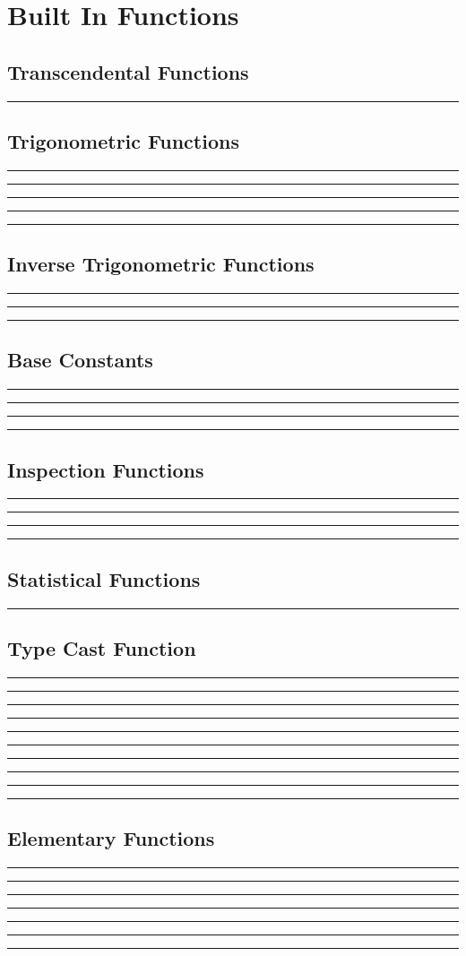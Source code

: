 \documentclass{book}
\begin{document}
\chapter{Built In Functions}

\section{Transcendental Functions}

\hrule


\section{Trigonometric Functions}

\hrule

\hrule

\hrule

\hrule

\hrule


\section{Inverse Trigonometric Functions}

\hrule

\hrule

\hrule


\section{Base Constants}

\hrule

\hrule

\hrule

\hrule


\section{Inspection Functions}

\hrule

\hrule

\hrule

\hrule


\section{Statistical Functions}

\hrule


\section{Type Cast Function}

\hrule

\hrule

\hrule

\hrule

\hrule

\hrule

\hrule

\hrule

\hrule

\hrule


\section{Elementary Functions}

\hrule

\hrule

\hrule

\hrule

\hrule

\hrule

\hrule

\end{document}
